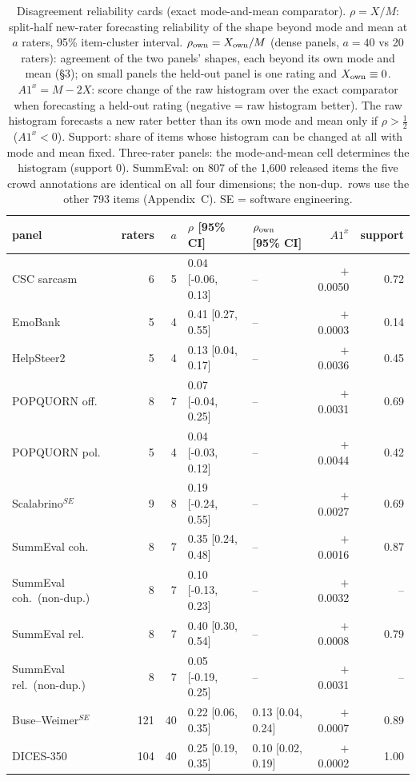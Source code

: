 \begin{table}[t]\centering\footnotesize
\caption{Disagreement reliability cards (exact mode-and-mean comparator). $\rho=X/M$: split-half new-rater forecasting reliability of the shape beyond mode and mean at $a$ raters, 95\% item-cluster interval. $\rho_{\rm own}=X_{\rm own}/M$ (dense panels, $a=40$ vs 20 raters): agreement of the two panels' shapes, each beyond its own mode and mean (\S3); on small panels the held-out panel is one rating and $X_{\rm own}\equiv0$. $A1^x=M-2X$: score change of the raw histogram over the exact comparator when forecasting a held-out rating (negative = raw histogram better). The raw histogram forecasts a new rater better than its own mode and mean only if $\rho>\tfrac12$ ($A1^x<0$). Support: share of items whose histogram can be changed at all with mode and mean fixed. Three-rater panels: the mode-and-mean cell determines the histogram (support 0). SummEval: on 807 of the 1,600 released items the five crowd annotations are identical on all four dimensions; the non-dup.\ rows use the other 793 items (Appendix~C). SE = software engineering.}\label{tab:cards}
\begin{tabular}{lrrllrr}\toprule panel & raters & $a$ & $\rho$ [95\% CI] & $\rho_{\rm own}$ [95\% CI] & $A1^x$ & support \\\midrule
CSC sarcasm & 6 & 5 & 0.04 [-0.06, 0.13] & -- & $+$0.0050 & 0.72 \\
EmoBank & 5 & 4 & 0.41 [0.27, 0.55] & -- & $+$0.0003 & 0.14 \\
HelpSteer2 & 5 & 4 & 0.13 [0.04, 0.17] & -- & $+$0.0036 & 0.45 \\
POPQUORN off. & 8 & 7 & 0.07 [-0.04, 0.25] & -- & $+$0.0031 & 0.69 \\
POPQUORN pol. & 5 & 4 & 0.04 [-0.03, 0.12] & -- & $+$0.0044 & 0.42 \\
Scalabrino$^{SE}$ & 9 & 8 & 0.19 [-0.24, 0.55] & -- & $+$0.0027 & 0.69 \\
SummEval coh. & 8 & 7 & 0.35 [0.24, 0.48] & -- & $+$0.0016 & 0.87 \\
SummEval coh.\ (non-dup.) & 8 & 7 & 0.10 [-0.13, 0.23] & -- & $+$0.0032 & -- \\
SummEval rel. & 8 & 7 & 0.40 [0.30, 0.54] & -- & $+$0.0008 & 0.79 \\
SummEval rel.\ (non-dup.) & 8 & 7 & 0.05 [-0.19, 0.25] & -- & $+$0.0031 & -- \\
Buse--Weimer$^{SE}$ & 121 & 40 & 0.22 [0.06, 0.35] & 0.13 [0.04, 0.24] & $+$0.0007 & 0.89 \\
DICES-350 & 104 & 40 & 0.25 [0.19, 0.35] & 0.10 [0.02, 0.19] & $+$0.0002 & 1.00 \\

\end{tabular}
\end{table}
